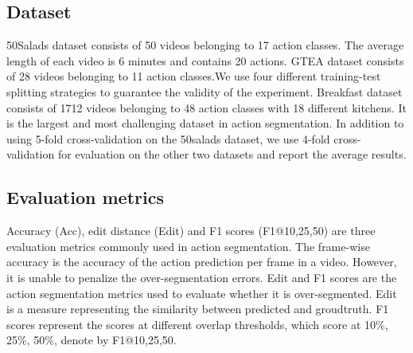 \documentclass[runningheads]{llncs}
\begin{document}
\subsection{Dataset}
\par{
	50Salads \cite{stein2013combining} dataset consists of 50 videos belonging to 17 action classes. The average length of each video is 6 minutes and contains 20 actions. GTEA \cite{fathi2011learning} dataset consists of 28 videos belonging to 11 action classes.We use four different training-test splitting strategies to guarantee the validity of the experiment. Breakfast \cite{kuehne2014language} dataset consists of 1712 videos belonging to 48 action classes with 18 different kitchens. It is the largest and most challenging dataset in action segmentation. In addition to using 5-fold cross-validation on the 50salads dataset, we use 4-fold cross-validation for evaluation on the other two datasets and report the average results.
}
\subsection{Evaluation metrics}
\par{
	Accuracy (Acc), edit distance (Edit) and F1 scores (F1@{10,25,50}) are three evaluation metrics commonly used in action segmentation. The frame-wise accuracy is the accuracy of the action prediction per frame in a video. However, it is unable to penalize the over-segmentation errors. Edit and F1 scores are the action segmentation metrics used to evaluate whether it is over-segmented. Edit is a measure representing the similarity between predicted and groudtruth. F1 scores represent the scores at different overlap thresholds, which score at {10\%, 25\%, 50\%}, denote by F1@{10,25,50}.
}
\end{document}
